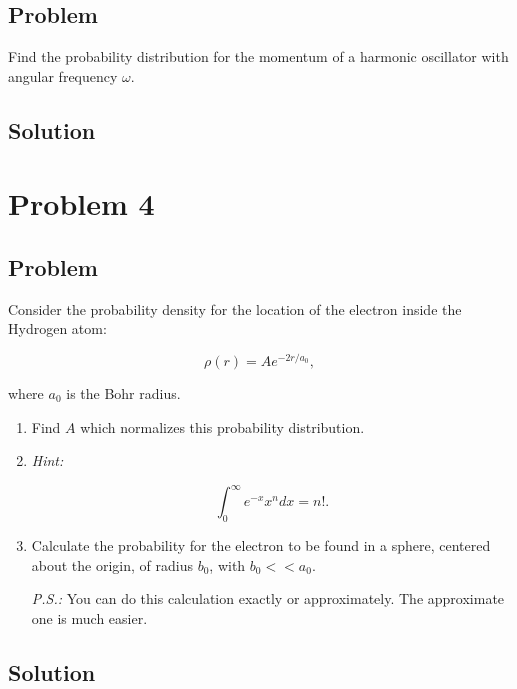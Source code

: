 \documentclass[12pt]{article}
\begin{document}
\subsection{Problem}

Find the probability distribution for the momentum of a harmonic oscillator with angular frequency \(\omega\).

\subsection{Solution}

\section{Problem 4}

\subsection{Problem}

Consider the probability density for the location of the electron inside the Hydrogen atom:

\begin{equation}
    \rho(r)=A e^{-2 r / a_{0}},
\end{equation}

where \(a_{0}\) is the Bohr radius.

\renewcommand{\labelenumi}{(\alph{enumi})}
\begin{enumerate}
    \item Find \(A\) which normalizes this probability distribution.
    \item
          \textit{Hint:}

          \begin{equation}
              \int_{0}^{\infty} e^{-x} x^{n} d x=n!.
          \end{equation}
    \item Calculate the probability for the electron to be found in a sphere, centered about the origin, of radius \(b_{0}\), with \(b_{0}<<a_{0}\).

          \textit{P.S.:} You can do this calculation exactly or approximately. The approximate one is much easier.
\end{enumerate}

\subsection{Solution}
\end{document}
